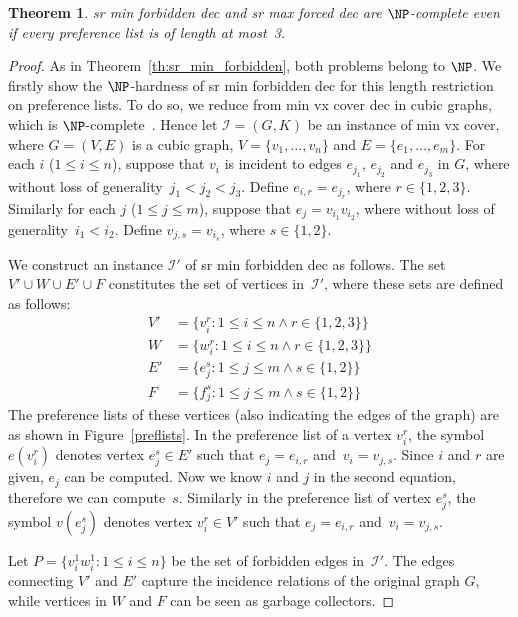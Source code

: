 \documentclass[preprint,12pt]{elsarticle}
\newtheorem{theorem}{Theorem}[section]
\begin{document}
\begin{theorem}
\label{th:sr_min_forbidden3}
{\sc sr min forbidden dec} and {\sc sr max forced dec} are $\NP$-complete even if every preference list is of length at most~3.
\end{theorem}
\begin{proof}
As in Theorem~\ref{th:sr_min_forbidden}, both problems belong to $\NP$.  We firstly show the $\NP$-hardness of {\sc sr min forbidden dec} for this length restriction on preference lists.  To do so, we reduce from {\sc min vx cover dec} in cubic graphs, which is $\NP$-complete~\cite{GJS76,MS77}.
Hence let $\mathcal{I} = (G,K)$ be an instance of {\sc min vx cover}, where $G=(V,E)$ is a cubic graph, $V=\{v_1,\dots,v_n\}$ and $E=\{e_1,\dots,e_m\}$. For each $i$ ($1\leq i\leq n$), suppose that $v_i$ is incident to edges $e_{j_1}$, $e_{j_2}$ and $e_{j_3}$ in $G$, where without loss of generality~$j_1<j_2<j_3$.  Define $e_{i,r}=e_{j_r}$, where $r \in \{1,2,3\}$. Similarly for each $j$ ($1\leq j\leq m$), suppose that $e_j=v_{i_1} v_{i_2}$, where without loss of generality~$i_1<i_2$. Define $v_{j,s}=v_{i_s}$, where $s \in \{1,2\}$. 

We construct an instance $\mathcal{I'}$ of {\sc sr min forbidden dec} as follows. The set $V' \cup W \cup E' \cup F$ constitutes the set of vertices in~$\mathcal{I'}$, where these sets are defined as follows:
\[
\begin{array}{llllllll}
	V' & = \{v_i^r : 1\leq i\leq n\wedge r \in \{1,2,3\}\}\\
	W  & = \{w_i^r : 1\leq i\leq n\wedge r \in \{1,2,3\}\}\\
	E' & = \{e_j^s : 1\leq j\leq m\wedge s \in \{1,2\}\}\\
	F & = \{f_j^s : 1\leq j\leq m\wedge s \in \{1,2\}\}	
\end{array}
\]
The preference lists of these vertices (also indicating the edges of the graph) are as shown in Figure~\ref{preflists}. In the preference list of a vertex $v_i^r$, the symbol $e(v_i^r)$ denotes vertex $e_j^s \in E'$ such that $e_j=e_{i,r}$ and~$v_i=v_{j,s}$.  Since $i$ and $r$ are given, $e_j$ can be computed. Now we know $i$ and $j$ in the second equation, therefore we can compute~$s$. Similarly in the preference list of vertex $e_j^s$, the symbol $v(e_j^s)$ denotes vertex $v_i^r \in V'$ such that $e_j=e_{i,r}$ and~$v_i=v_{j,s}$. 


Let $P=\{v_i^1 w_i^1 : 1\leq i\leq n\}$ be the set of forbidden edges in~$\mathcal{I'}$. The edges connecting $V'$ and $E'$ capture the incidence relations of the original graph $G$, while vertices in $W$ and $F$ can be seen as garbage collectors.


\end{proof}
\end{document}

